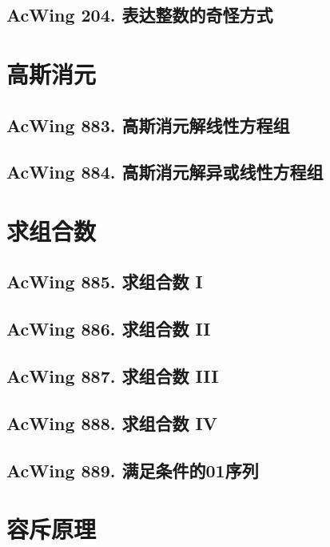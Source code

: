 \subsection{AcWing 204. 表达整数的奇怪方式}


\section{高斯消元}

\subsection{AcWing 883. 高斯消元解线性方程组}

\subsection{AcWing 884. 高斯消元解异或线性方程组}


\section{求组合数}

\subsection{AcWing 885. 求组合数 I}

\subsection{AcWing 886. 求组合数 II}

\subsection{AcWing 887. 求组合数 III}

\subsection{AcWing 888. 求组合数 IV}

\subsection{AcWing 889. 满足条件的01序列}


\section{容斥原理}

